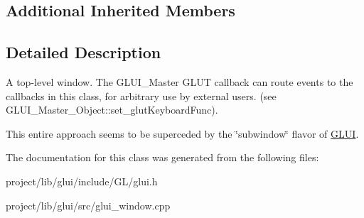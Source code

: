 \subsection*{Additional Inherited Members}


\subsection{Detailed Description}
A top-\/level window. The G\-L\-U\-I\-\_\-\-Master G\-L\-U\-T callback can route events to the callbacks in this class, for arbitrary use by external users. (see G\-L\-U\-I\-\_\-\-Master\-\_\-\-Object\-::set\-\_\-glut\-Keyboard\-Func).

This entire approach seems to be superceded by the \char`\"{}subwindow\char`\"{} flavor of \hyperlink{classGLUI}{G\-L\-U\-I}. 

The documentation for this class was generated from the following files\-:\begin{DoxyCompactItemize}
\item 
project/lib/glui/include/\-G\-L/glui.\-h\item 
project/lib/glui/src/glui\-\_\-window.\-cpp\end{DoxyCompactItemize}
